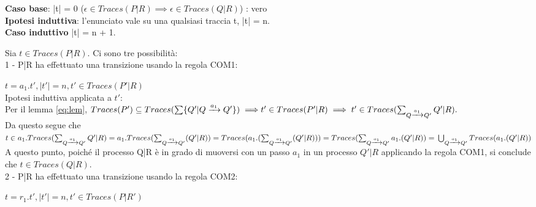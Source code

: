 \textbf{Caso base}: |t| = 0 ($\epsilon \in Traces(P|R) \implies \epsilon \in Traces(Q|R)$) : vero \\

\textbf{Ipotesi induttiva}: l'enunciato vale su una qualsiasi traccia t, |t| = n. \\

\textbf{Caso induttivo} |t| = n + 1.

Sia $t \in Traces(P|R)$. Ci sono tre possibilità: \\

1 - P|R ha effettuato una transizione usando la regola COM1:

\begin{prooftree}
\end{prooftree}

$t = a_1.t', |t'| = n, t' \in Traces(P'|R)$ \\

Ipotesi induttiva applicata a $t'$: \\

Per il lemma \ref{eq:lem}, $Traces(P') \subseteq  Traces(\sum \{ Q' | Q \xrightarrow[]{a_1} Q' \}) \implies \\
t' \in Traces(P'|R) \implies t' \in Traces(\sum_{Q \xrightarrow[]{a_1} Q'} Q'|R).$ \\

Da questo segue che $t \in a_1.Traces(\sum_{Q \xrightarrow[]{a_1} Q'} Q'|R) = a_1.Traces(\sum_{Q \xrightarrow[]{a_1} Q'} (Q'|R)) \\
= Traces(a_1.(\sum_{Q \xrightarrow[]{a_1} Q'} (Q'|R))) = Traces(\sum_{Q \xrightarrow[]{a_1} Q'} a_1.(Q'|R)) = \\
\bigcup_{Q \xrightarrow[]{a_1} Q'} Traces(a_1.(Q'|R))$\\

A questo punto, poiché il processo Q|R è in grado di muoversi con un passo $a_1$ in un processo $Q'|R$ applicando la regola COM1,
si conclude che $t \in Traces(Q|R).$ \\

2 - P|R ha effettuato una transizione usando la regola COM2:

\begin{prooftree}
\end{prooftree}

$t = r_1.t', |t'| = n, t' \in Traces(P|R')$ \\

